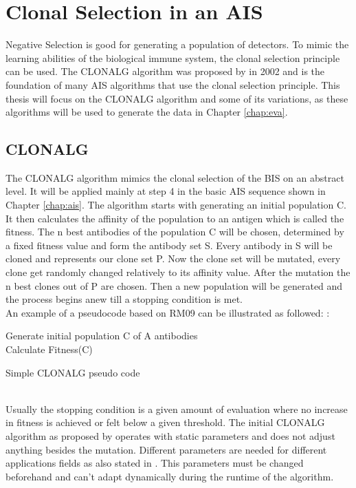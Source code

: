 \section{Clonal Selection in an AIS}
Negative Selection is good for generating a population of detectors. To mimic the learning abilities of the biological immune system, the clonal selection principle can be used. The CLONALG algorithm was proposed by \cite{DEC02} in 2002 and is the foundation of many AIS algorithms that use the clonal selection principle. This thesis will focus on the CLONALG algorithm and some of its variations, as these algorithms will be used to generate the data in Chapter \ref{chap:eva}.
\subsection{CLONALG}
The CLONALG algorithm mimics the clonal selection of the BIS on an abstract level. It will be applied mainly at step 4 in the basic AIS sequence shown in Chapter \ref{chap:ais}. The algorithm starts with generating an initial population C. It then calculates the affinity of the population to an antigen which is called the fitness. The n best antibodies of the population C will be chosen, determined by a fixed fitness value and form the antibody set S. Every antibody in S will be cloned and represents our clone set P. Now the clone set will be mutated, every clone get randomly changed relatively to its affinity value. After the mutation the n best clones out of P are chosen. Then a new population will be generated and the process begins anew till a stopping condition is met.\\
An example of a pseudocode based on RM09 can be illustrated as followed: \cite{RIFF09}:
\begin{algorithm}
	Generate initial population C of A antibodies\\
	Calculate Fitness(C)\\
	\caption{Simple CLONALG pseudo code}
\end{algorithm}\\
Usually the stopping condition is a given amount of evaluation where no increase in fitness is achieved or felt below a given threshold. The initial CLONALG algorithm as proposed by \cite{DEC02} operates with static parameters and does not adjust anything besides the mutation. Different parameters are needed for different applications fields as also stated in \cite{DEC02}. This parameters must be changed beforehand and can't adapt dynamically during the runtime of the algorithm.\\\\
